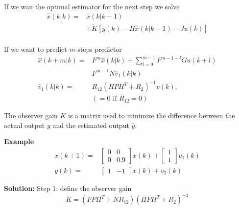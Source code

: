 \begin{multicols}{2}
If we wan the optimal estimator for the next step we solve
\begin{align*}
    \hat{x}(k|k) = &\hat{x}(k|k-1) \\
    &+ \tilde{K}[y(k)-H\hat{x}(k|k-1)-Ju(k)] \\
\end{align*}

If we want to predict $m$-steps predictor
\begin{align*}
    \hat{x}(k+m|k) = &F^m \hat{x}(k|k) + \sum^{m-1}_{l=0} F^{m-1-l} Gu(k+l) \\
    &F^{m-1} N\hat{v}_1(k|k) \\
    \hat{v}_1(k|k) = &R_{12}(HPH^T + R_2)^{-1}v(k), \\
    & (=0 \text{ if } R_{12}=0)
\end{align*}

The observer gain $K$ is a matrix used to minimize 
the difference between the actual output $y$ and 
the estimated output $\hat{y}$.

\textbf{Example}\newline
\begin{align*}
    x(k+1) = &\begin{bmatrix} 0 & 0 \\ 0 & 0.9 \end{bmatrix}x(k)
    +\begin{bmatrix} 1 \\ 1 \end{bmatrix}v_1(k) \\
    y(k) = &\begin{bmatrix} 1 & -1 \end{bmatrix}x(k) + v_2(k)
\end{align*}

\textbf{Solution:}\newline
Step 1: define the observer gain
\begin{equation*}
    K = (FPH^T + NR_{12})(HPH^T + R_2)^{-1}
\end{equation*}


\end{multicols}
